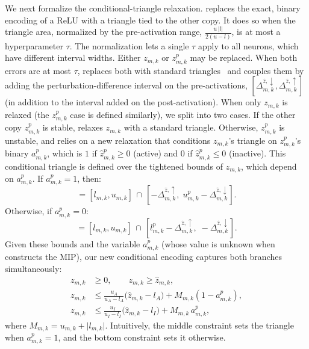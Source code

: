 {We next formalize the conditional-triangle relaxation.
\tool replaces the exact, binary encoding of a  ReLU with a triangle tied to the other copy.
It does so when the triangle area, normalized by the pre-activation range,
$\tfrac{u\,\lvert l\rvert}{2(u-l)}$, is at most a hyperparameter $\tau$. The normalization lets a single
$\tau$ apply to all neurons, which have different interval widths. Either $z_{m,k}$ or $z^{p}_{m,k}$ may be replaced.
When both errors are at most $\tau$, \tool replaces both with standard triangles~\cite{ehlers2017} and
couples them by adding the perturbation-difference interval on the pre-activations,
$[\Delta^{\hat z,\downarrow}_{m,k},\Delta^{\hat z,\uparrow}_{m,k}]$ (in addition to the interval added on
the post-activation).
When only $z_{m,k}$ is relaxed (the $z^{p}_{m,k}$ case is defined similarly), we split into two cases. If
the other copy $z^{p}_{m,k}$ is stable, \tool relaxes $z_{m,k}$ with a standard triangle. Otherwise,
$z^{p}_{m,k}$ is unstable, and
\tool relies on a new relaxation that conditions $z_{m,k}$'s triangle on $z^{p}_{m,k}$'s binary
$a^{p}_{m,k}$, which is $1$ if $\hat z^{p}_{m,k}\ge0$ (active) and $0$ if $\hat z^{p}_{m,k}\le0$
(inactive). This conditional triangle is defined over the tightened bounds of $z_{m,k}$, which depend on
$a^{p}_{m,k}$.
If $a^{p}_{m,k}=1$, then:
\begin{equation}
 [l_A, u_A] = [l_{m,k}, u_{m,k}] \,\cap\, [-\Delta^{\hat z,\uparrow}_{m,k},\; u^{p}_{m,k} - \Delta^{\hat z,\downarrow}_{m,k}].
 \label{eq:condtri-active-bounds}
\end{equation}
Otherwise, if $a^{p}_{m,k}=0$:
\begin{equation}
 [l_I, u_I] = [l_{m,k}, u_{m,k}] \,\cap\, [l^{p}_{m,k} - \Delta^{\hat z,\uparrow}_{m,k},\; -\Delta^{\hat z,\downarrow}_{m,k}].
 \label{eq:condtri-inactive-bounds}
\end{equation}
Given these bounds and the variable $a^{p}_{m,k}$ (whose value is unknown when \tool
constructs the MIP), our new conditional encoding captures both branches simultaneously:
\begin{equation}
\begin{aligned}
 z_{m,k} &\ge 0, \qquad z_{m,k} \ge \hat z_{m,k}, \\
 z_{m,k} &\le \tfrac{u_A}{u_A - l_A}\bigl(\hat z_{m,k} - l_A\bigr) + M_{m,k}(1 - a^{p}_{m,k}), \\
 z_{m,k} &\le \tfrac{u_I}{u_I - l_I}\bigl(\hat z_{m,k} - l_I\bigr) + M_{m,k}\,a^{p}_{m,k},
\end{aligned}
\label{eq:condtri-encoding}
\end{equation}
where $M_{m,k}=u_{m,k}+\lvert l_{m,k}\rvert$. Intuitively, the middle constraint sets the
triangle when $a^{p}_{m,k}=1$, and the bottom constraint sets it otherwise.

}
